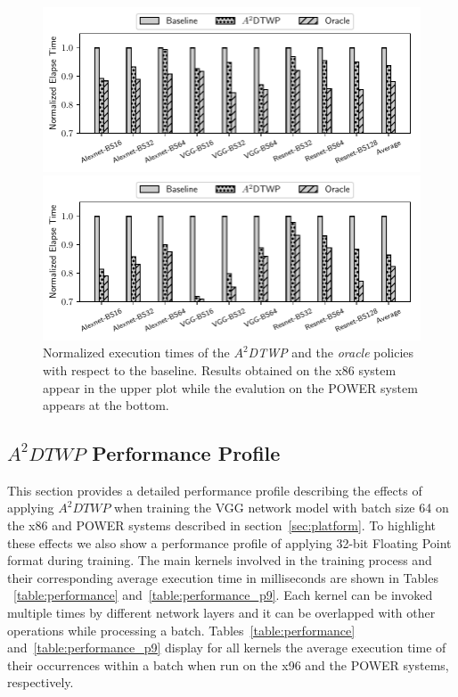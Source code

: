 \begin{figure}%
    \centerline{\includegraphics[scale=0.85]{bitpack/figs/all_bars.pdf}}
    \centerline{\includegraphics[scale=0.85]{bitpack/figs/all_bars_p9.pdf}}
    \caption{Normalized execution times of the \textit{$A^2$DTWP} and the 
    \textit{oracle} policies with respect to the baseline.  Results obtained on 
    the x86 system appear in the upper plot while the evalution on the POWER 
    system appears at the bottom.} \label{fig:all}
\end{figure}

\subsection{$A^2DTWP$ Performance Profile}
\label{sec:performance}
This section provides a detailed performance profile describing the effects of 
applying $A^2DTWP$ when training the VGG network model with batch size 64 on the 
x86 and POWER systems described in section~\ref{sec:platform}.
To highlight these effects we also show a performance profile of applying 32-bit 
Floating Point format during training.
The main kernels involved in the training process and their corresponding 
average execution time in milliseconds are shown in Tables 
~\ref{table:performance} and~\ref{table:performance_p9}.
Each kernel can be invoked multiple times by different network layers and it can 
be overlapped with other operations while processing a batch.
Tables~\ref{table:performance} and~\ref{table:performance_p9} display for all 
kernels the average execution time of their occurrences within a batch when run 
on the x96 and the POWER systems, respectively.

